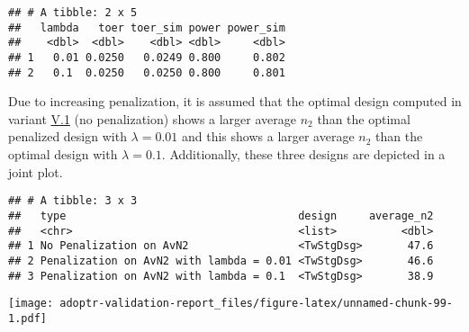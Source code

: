 \documentclass[]{book}
\begin{document}
\begin{verbatim}
## # A tibble: 2 x 5
##   lambda   toer toer_sim power power_sim
##    <dbl>  <dbl>    <dbl> <dbl>     <dbl>
## 1   0.01 0.0250   0.0249 0.800     0.802
## 2   0.1  0.0250   0.0250 0.800     0.801
\end{verbatim}

Due to increasing penalization, it is assumed that the optimal design
computed in variant \protect\hyperlink{variantV_1}{V.1} (no penalization) shows a larger
average \(n_2\) than the optimal penalized design with \(\lambda = 0.01\)
and this shows a larger average \(n_2\) than the optimal design
with \(\lambda = 0.1\).
Additionally, these three designs are depicted in a joint plot.

\begin{verbatim}
## # A tibble: 3 x 3
##   type                                    design     average_n2
##   <chr>                                   <list>          <dbl>
## 1 No Penalization on AvN2                 <TwStgDsg>       47.6
## 2 Penalization on AvN2 with lambda = 0.01 <TwStgDsg>       46.6
## 3 Penalization on AvN2 with lambda = 0.1  <TwStgDsg>       38.9
\end{verbatim}

\texttt{[image: adoptr-validation-report\_files/figure-latex/unnamed-chunk-99-1.pdf]}


\end{document}

